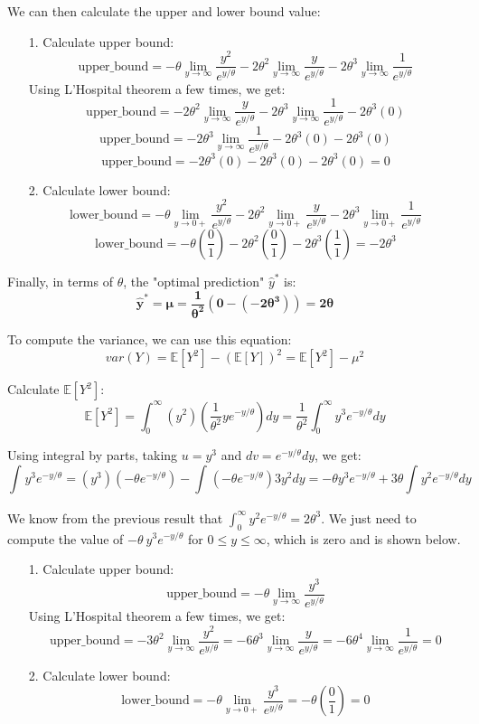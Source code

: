 \documentclass[twoside]{homework}
\begin{document}
\begin{itemize}
    We can then calculate the upper and lower bound value:
        \begin{itemize}
            \item[1.] Calculate upper bound:
            $$\text{upper\_bound}=-\theta\lim_{y\to\infty}\frac{y^2}{e^{y/\theta}}-2\theta^2\lim_{y\to\infty}\frac{y}{e^{y/\theta}}-2{\theta}^3\lim_{y\to\infty}\frac{1}{e^{y/\theta}}$$
            Using L'Hospital theorem a few times, we get:
            $$\text{upper\_bound}=-2\theta^2\lim_{y\to\infty}\frac{y}{e^{y/\theta}}-2\theta^3\lim_{y\to\infty}\frac{1}{e^{y/\theta}}-2\theta^3(0)$$
            $$\text{upper\_bound}=-2\theta^3\lim_{y\to\infty}\frac{1}{e^{y/\theta}}-2\theta^3(0)-2\theta^3(0)$$
            $$\text{upper\_bound}=-2\theta^3(0)-2\theta^3(0)-2\theta^3(0)=0$$
            \item[2.] Calculate lower bound:
            $$\text{lower\_bound}=-\theta\lim_{y\to{0}+}\frac{y^2}{e^{y/\theta}}-2\theta^2\lim_{y\to{0}+}\frac{y}{e^{y/\theta}}-2{\theta}^3\lim_{y\to{0}+}\frac{1}{e^{y/\theta}}$$
            $$\text{lower\_bound}=-\theta(\frac{0}{1})-2\theta^2(\frac{0}{1})-2{\theta}^3(\frac{1}{1})=-2{\theta}^3$$
        \end{itemize}

    Finally, in terms of $\theta$, the "optimal prediction" $\hat{y}^*$ is:
    $$\boldsymbol{\hat{y}^*=\mu=\frac{1}{\theta^2}(0-(-2\theta^3))=2\theta}$$

    To compute the variance, we can use this equation:
    $$var(Y)=\mathbb{E}[Y^2]-(\mathbb{E}[Y])^2=\mathbb{E}[Y^2]-\mu^2$$

    Calculate $\mathbb{E}[Y^2]$:
    $$\mathbb{E}[Y^2]=\int_{0}^{\infty}(y^2)(\frac{1}{\theta^2}ye^{-y/\theta})dy=\frac{1}{\theta^2}\int_{0}^{\infty}y^3e^{-y/\theta}dy$$

    Using integral by parts, taking $u=y^3$ and $dv=e^{-y/\theta}dy$, we get:
    $$\int_{}^{}y^3e^{-y/\theta}=(y^3)(-\theta{e^{-y/\theta}})-\int_{}^{}(-\theta{e^{-y/\theta}})3y^2dy=-\theta{y^3}{e^{-y/\theta}}+3\theta\int_{}^{}y^2{e^{-y/\theta}}dy$$

    We know from the previous result that $\int_{0}^{\infty}y^2e^{-y/\theta}=2\theta^3$. We just need to compute the value of ${-}\theta\:y^3e^{{-}y/\theta}$ for $0\leq{y}\leq{\infty}$, which is zero and is shown below.
        \begin{itemize}
            \item[1.] Calculate upper bound:
            $$\text{upper\_bound}=-\theta\lim_{y\to\infty}\frac{y^3}{e^{y/\theta}}$$
            Using L'Hospital theorem a few times, we get:
            $$\text{upper\_bound}=-3\theta^2\lim_{y\to\infty}\frac{y^2}{e^{y/\theta}}=-6\theta^3\lim_{y\to\infty}\frac{y}{e^{y/\theta}}=-6\theta^4\lim_{y\to\infty}\frac{1}{e^{y/\theta}}=0$$
            \item[2.] Calculate lower bound:
            $$\text{lower\_bound}=-\theta\lim_{y\to{0}+}\frac{y^3}{e^{y/\theta}}=-\theta(\frac{0}{1})=0$$
        \end{itemize}


\end{itemize}
\end{document}
